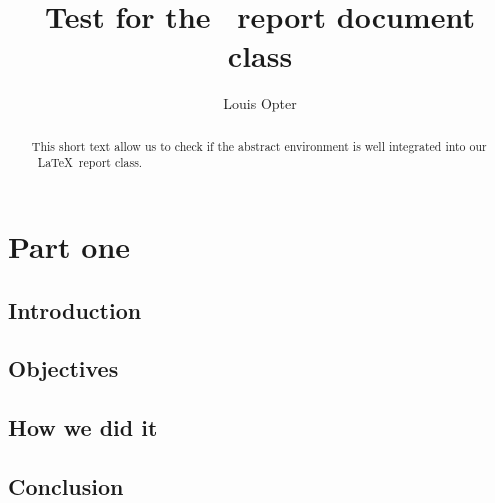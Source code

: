 \documentclass{rtxreport}
\author{Louis Opter}
\title{Test for the \rtx\ report document class}
\begin{document}
\maketitle

\begin{abstract}
This short text allow us to check if the abstract environment is well
integrated into our \rtx\ \LaTeX\ report class.
\end{abstract}

\rtxmaketitleblock

\tableofcontents

\chapter{Part one}

\section{Introduction}

\lipsum[1]

\section{Objectives}

\lipsum[2]

\section{How we did it}

\lipsum[3]

\section{Conclusion}

\lipsum[4]
\end{document}

